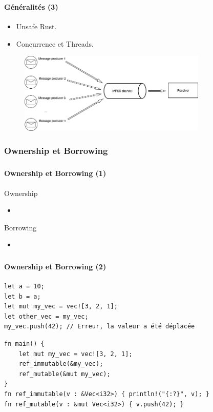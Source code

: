 \documentclass[10pt]{beamer}
\begin{document}
\begin{frame}
    \frametitle{\subsecname}
    \framesubtitle{Généralités (3)}
    \begin{itemize}
        \item Unsafe Rust.
        \item Concurrence et Threads.
    \end{itemize}
    \begin{center}
        \begin{figure}
            \includegraphics[width=0.8\textwidth]{images/mpsc.png}
        \end{figure}
    \end{center}
\end{frame}

\subsubsection{Ownership et Borrowing}
\begin{frame}
    \frametitle{\subsecname}
    \framesubtitle{Ownership et Borrowing (1)}
    Ownership
    \begin{itemize}
        \item 
    \end{itemize}
    Borrowing
    \begin{itemize}
        \item 
    \end{itemize}
\end{frame}

\begin{frame}[fragile]
    \frametitle{\subsecname}
    \framesubtitle{Ownership et Borrowing (2)}
    \begin{verbatim}
let a = 10;
let b = a;
let mut my_vec = vec![3, 2, 1]; 
let other_vec = my_vec;
my_vec.push(42); // Erreur, la valeur a été déplacée
    \end{verbatim}
    \begin{verbatim}
fn main() {
    let mut my_vec = vec![3, 2, 1];
    ref_immutable(&my_vec);
    ref_mutable(&mut my_vec);
}
fn ref_immutable(v : &Vec<i32>) { println!("{:?}", v); }
fn ref_mutable(v : &mut Vec<i32>) { v.push(42); }
    \end{verbatim}
\end{frame}
\end{document}
